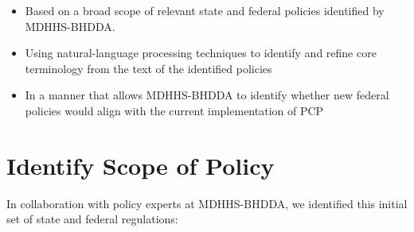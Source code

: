 \documentclass[
]{book}
\providecommand{\tightlist}{%
  \setlength{\itemsep}{0pt}\setlength{\parskip}{0pt}}
\begin{document}
\begin{itemize}
\tightlist
\item
  Based on a broad scope of relevant state and federal policies identified by MDHHS-BHDDA.
\item
  Using natural-language processing techniques to identify and refine core terminology from the text of the identified policies
\item
  In a manner that allows MDHHS-BHDDA to identify whether new federal policies would align with the current implementation of PCP
\end{itemize}

\hypertarget{identify-scope-of-policy}{%
\section{Identify Scope of Policy}\label{identify-scope-of-policy}}

In collaboration with policy experts at MDHHS-BHDDA, we identified this initial set of state and federal regulations:
\end{document}

